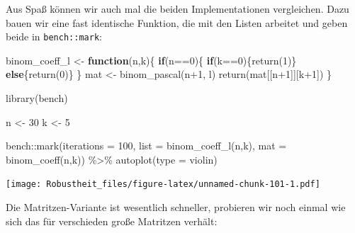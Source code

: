 \documentclass[
]{book}
\newenvironment{Shaded}{\begin{snugshade}}{\end{snugshade}}
\newcommand{\AttributeTok}[1]{\textcolor[rgb]{0.77,0.63,0.00}{#1}}
\newcommand{\ControlFlowTok}[1]{\textcolor[rgb]{0.13,0.29,0.53}{\textbf{#1}}}
\newcommand{\DecValTok}[1]{\textcolor[rgb]{0.00,0.00,0.81}{#1}}
\newcommand{\FunctionTok}[1]{\textcolor[rgb]{0.00,0.00,0.00}{#1}}
\newcommand{\NormalTok}[1]{#1}
\newcommand{\OtherTok}[1]{\textcolor[rgb]{0.56,0.35,0.01}{#1}}
\newcommand{\SpecialCharTok}[1]{\textcolor[rgb]{0.00,0.00,0.00}{#1}}
\newcommand{\StringTok}[1]{\textcolor[rgb]{0.31,0.60,0.02}{#1}}
\begin{document}
Aus Spaß können wir auch mal die beiden Implementationen vergleichen.
Dazu bauen wir eine fast identische Funktion, die mit den Listen arbeitet und geben beide in \texttt{bench::mark}:

\begin{Shaded}
\begin{Highlighting}[]
\NormalTok{binom\_coeff\_l }\OtherTok{\textless{}{-}} \ControlFlowTok{function}\NormalTok{(n,k)\{}
  \ControlFlowTok{if}\NormalTok{(n}\SpecialCharTok{==}\DecValTok{0}\NormalTok{)\{ }
    \ControlFlowTok{if}\NormalTok{(k}\SpecialCharTok{==}\DecValTok{0}\NormalTok{)\{}\FunctionTok{return}\NormalTok{(}\DecValTok{1}\NormalTok{)\} }\ControlFlowTok{else}\NormalTok{\{}\FunctionTok{return}\NormalTok{(}\DecValTok{0}\NormalTok{)\}}
\NormalTok{  \}}
\NormalTok{  mat }\OtherTok{\textless{}{-}} \FunctionTok{binom\_pascal}\NormalTok{(n}\SpecialCharTok{+}\DecValTok{1}\NormalTok{, }\StringTok{\textquotesingle{}l\textquotesingle{}}\NormalTok{)}
  \FunctionTok{return}\NormalTok{(mat[[n}\SpecialCharTok{+}\DecValTok{1}\NormalTok{]][k}\SpecialCharTok{+}\DecValTok{1}\NormalTok{])}
\NormalTok{\}}

\FunctionTok{library}\NormalTok{(bench)}

\NormalTok{n }\OtherTok{\textless{}{-}} \DecValTok{30}
\NormalTok{k }\OtherTok{\textless{}{-}} \DecValTok{5}

\NormalTok{bench}\SpecialCharTok{::}\FunctionTok{mark}\NormalTok{(}\AttributeTok{iterations =} \DecValTok{100}\NormalTok{,}
            \AttributeTok{list =} \FunctionTok{binom\_coeff\_l}\NormalTok{(n,k),}
            \AttributeTok{mat =} \FunctionTok{binom\_coeff}\NormalTok{(n,k)) }\SpecialCharTok{\%\textgreater{}\%} 
  \FunctionTok{autoplot}\NormalTok{(}\AttributeTok{type =} \StringTok{\textquotesingle{}violin\textquotesingle{}}\NormalTok{)}
\end{Highlighting}
\end{Shaded}

\texttt{[image: Robustheit\_files/figure-latex/unnamed-chunk-101-1.pdf]}

Die Matritzen-Variante ist wesentlich schneller, probieren wir noch einmal wie sich das für verschieden große Matritzen verhält:
\end{document}
